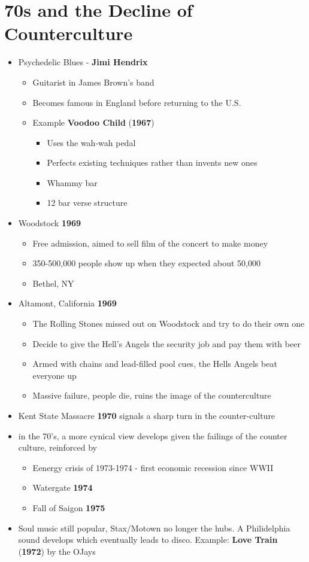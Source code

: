 \documentclass[11pt]{report}
\newcommand{\imp}[1]{\textbf{#1}}
\newcommand{\idate}[2]{\textcolor{blue!50}{\imp{#1}}\label{date:#2}}
\newcommand{\bl}{\begin{itemize}}
\newcommand{\kl}{\end{itemize}}
\newcommand{\song}[2]{\textcolor{red!70}{\textbf{#1}} (\idate{#2}{#1})}
\begin{document}
\section{70s and the Decline of Counterculture}
\begin{itemize}
	\item Psychedelic Blues - \textbf{Jimi Hendrix}
	\bl
		\item Guitarist in James Brown's band
		\item Becomes famous in England before returning to the U.S.
		\item Example \song{Voodoo Child}{1967}
		\bl
			\item Uses the wah-wah pedal
			\item Perfects existing techniques rather than invents new ones
			\item Whammy bar
			\item 12 bar verse structure
		\kl
	\kl
	\item Woodstock \idate{1969}{woodstock}
	\bl
		\item Free admission, aimed to sell film of the concert to make money
		\item 350-500,000 people show up when they expected about 50,000
		\item Bethel, NY
	\kl
	\item Altamont, California \idate{1969}{altamont}
	\bl
		\item The Rolling Stones missed out on Woodstock and try to do their own one
		\item Decide to give the Hell's Angels the security job and pay them with beer
		\item Armed with chains and lead-filled pool cues, the Hells Angels beat everyone up
		\item Massive failure, people die, ruins the image of the counterculture
	\kl
	\item Kent State Massacre \idate{1970}{kent-state} signals a sharp turn in the counter-culture
	\item in the 70's, a more cynical view develops given the failings of the counter culture, reinforced by
	\bl
		\item Eenergy crisis of 1973-1974 - first economic recession since WWII
		\item Watergate \idate{1974}{watergate}
		\item Fall of Saigon \idate{1975}{fall-saigon}
	\kl
	\item Soul music still popular, Stax/Motown no longer the hubs. A Philidelphia sound develops which eventually leads to disco. Example: \song{Love Train}{1972} by the OJays

\end{itemize}
\end{document}
